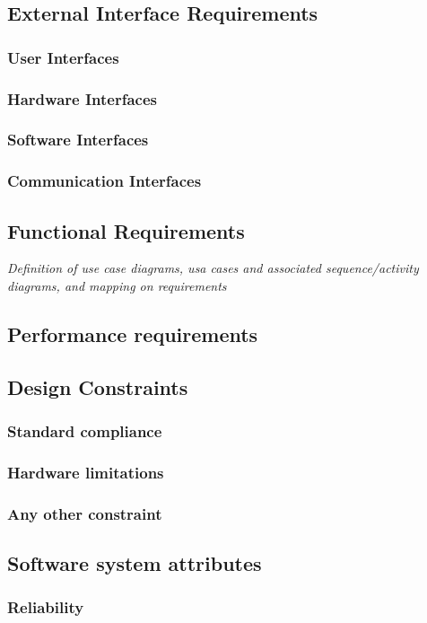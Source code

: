 \documentclass{article}
\begin{document}
	\subsection{External Interface Requirements}
		\subsubsection{User Interfaces}
		\subsubsection{Hardware Interfaces}
		\subsubsection{Software Interfaces}
		\subsubsection{Communication Interfaces}
	\subsection{Functional Requirements} \textit{Definition of use case diagrams, usa cases and associated sequence/activity diagrams, and mapping on requirements}
	\subsection{Performance requirements}
	\subsection{Design Constraints}
		\subsubsection{Standard compliance}
		\subsubsection{Hardware limitations}
		\subsubsection{Any other constraint}
	\subsection{Software system attributes}
		\subsubsection{Reliability}
\end{document}
